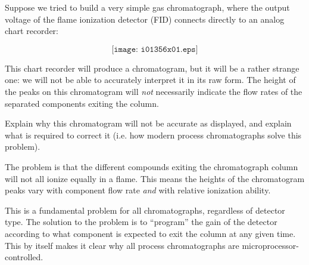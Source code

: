 

Suppose we tried to build a very simple gas chromatograph, where the output voltage of the flame ionization detector (FID) connects directly to an analog chart recorder:

$$\texttt{[image: i01356x01.eps]}$$

This chart recorder will produce a chromatogram, but it will be a rather strange one: we will not be able to accurately interpret it in its raw form.  The height of the peaks on this chromatogram will {\it not} necessarily indicate the flow rates of the separated components exiting the column.

Explain why this chromatogram will not be accurate as displayed, and explain what is required to correct it (i.e. how modern process chromatographs solve this problem).







The problem is that the different compounds exiting the chromatograph column will not all ionize equally in a flame.  This means the heights of the chromatogram peaks vary with component flow rate {\it and} with relative ionization ability.
 
\vskip 10pt

This is a fundamental problem for all chromatographs, regardless of detector type.  The solution to the problem is to ``program'' the gain of the detector according to what component is expected to exit the column at any given time.  This by itself makes it clear why all process chromatographs are microprocessor-controlled.











